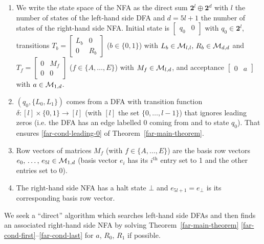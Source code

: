 {  \begin{enumerate}
    \item We write the state space of the NFA as the direct sum $\mathbf{2}^l \oplus \mathbf{2}^d$ with $l$ the number of states of the left-hand side DFA and $d=5l+1$ the number of states of the right-hand side NFA. Initial state is $\begin{bmatrix}q_0&0\end{bmatrix}$ with $q_0 \in \mathbf{2}^l$,
          transitions
          $T_b=\begin{bmatrix}L_b&0\\0&R_b\end{bmatrix}$ ($b\in\{0,1\}$) with $L_b \in \mathcal{M}_{l,l},\, R_b \in \mathcal{M}_{d,d}$ and
          $T_f=\begin{bmatrix}0&M_f\\0&0\end{bmatrix}$ ($f\in\{A,\ldots,E\}$) with $M_f \in \mathcal{M}_{l,d}$,
          and acceptance $\begin{bmatrix}0&a\end{bmatrix}$ with $a \in \mathcal{M}_{1,d}$.
    \item $(q_0,\{L_0, L_1\})$ comes from a DFA with transition function $\delta: [l] \times \{0,1\} \to [l]$ (with $[l]$ the set $\{0,\dots,l-1\}$) that ignores leading zeros (i.e. the DFA has an edge labelled 0 coming from and to state $q_0$). That ensures \eqref{far-cond-leading-0} of Theorem~\ref{far-main-theorem}.
    \item Row vectors of matrices $M_f$ (with $f\in\{A,\ldots,E\}$) are the basis row vectors $e_0,\, \dots,\, e_{5l} \in \mathcal{M}_{1,d}$ (basis vector $e_i$ has its $i^\text{th}$ entry set to 1 and the other entries set to 0).\label{pt:basis}
    \item The right-hand side NFA has a halt state $\bot$ and $e_{5l+1} = e_\bot$ is its corresponding basis row vector.

  \end{enumerate}

  We seek a ``direct'' algorithm which searches left-hand side DFAs and then finds an associated right-hand side NFA by solving Theorem~\ref{far-main-theorem} \eqref{far-cond-first}--\eqref{far-cond-last} for $a$, $R_0$, $R_1$ if possible.

}
